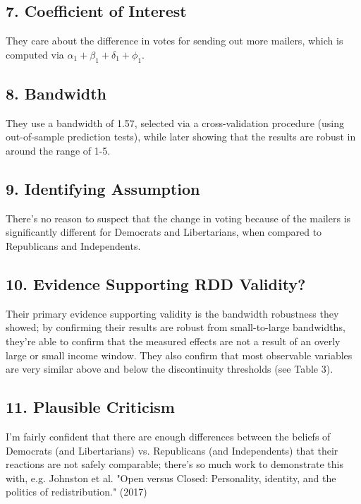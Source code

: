 \documentclass{article}
\begin{document}
\subsection*{7. Coefficient of Interest}

They care about the difference in votes for sending out more mailers, which is computed via $\alpha_1 + \beta_1 + \delta_1 + \phi_1$.

\subsection*{8. Bandwidth}

They use a bandwidth of 1.57, selected via a cross-validation procedure (using out-of-sample prediction tests), while later showing that the results are robust in around the range of 1-5.

\subsection*{9. Identifying Assumption}

There's no reason to suspect that the change in voting because of the mailers is significantly different for Democrats and Libertarians, when compared to Republicans and Independents.

\subsection*{10. Evidence Supporting RDD Validity?}

Their primary evidence supporting validity is the bandwidth robustness they showed; by confirming their results are robust from small-to-large bandwidths, they're able to confirm that the measured effects are not a result of an overly large or small income window. They also confirm that most observable variables are very similar above and below the discontinuity thresholds (see Table 3).

\subsection*{11. Plausible Criticism}

I'm fairly confident that there are enough differences between the beliefs of Democrats (and Libertarians) vs. Republicans (and Independents) that their reactions are not safely comparable; there's so much work to demonstrate this with, e.g. Johnston et al. "Open versus Closed: Personality, identity, and the politics of redistribution." (2017)
\end{document}
